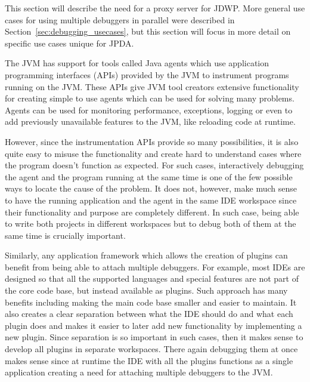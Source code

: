 \documentclass[..thesis.tex]{subfiles}
\begin{document}
This section will describe the need for a proxy server for JDWP.
More general use cases for using multiple debuggers in parallel were described in Section~\ref{sec:debugging_usecases}, 
but this section will focus in more detail on specific use cases unique for JPDA.

The JVM has support for tools called Java agents which use application programming interfaces (APIs) provided by the JVM to instrument programs running on the JVM.
These APIs give JVM tool creators extensive functionality for creating simple to use agents which can be used for solving many problems.
Agents can be used for monitoring performance, exceptions, logging or even to add previously unavailable features to the JVM, like reloading code at runtime.

However, since the instrumentation APIs provide so many possibilities, it is also quite easy to misuse the functionality and create hard to understand cases where the program doesn't function as expected.
For such cases, interactively debugging the agent and the program running at the same time is one of the few possible ways to locate the cause of the problem.
It does not, however, make much sense to have the running application and the agent in the same IDE workspace since their functionality and purpose are completely different.
In such case, being able to write both projects in different workspaces but to debug both of them at the same time is crucially important.

Similarly, any application framework which allows the creation of plugins can benefit from being able to attach multiple debuggers.
For example, most IDEs are designed so that all the supported languages and special features are not part of the core code base, but instead available as plugins. 
Such approach has many benefits including making the main code base smaller and easier to maintain.
It also creates a clear separation between what the IDE should do and what each plugin does and makes it easier to later add new functionality by implementing a new plugin.
Since separation is so important in such cases, then it makes sense to develop all plugins in separate workspaces.
There again debugging them at once makes sense since at runtime the IDE with all the plugins functions as a single application creating a need for attaching multiple debuggers to the JVM.
\end{document}
